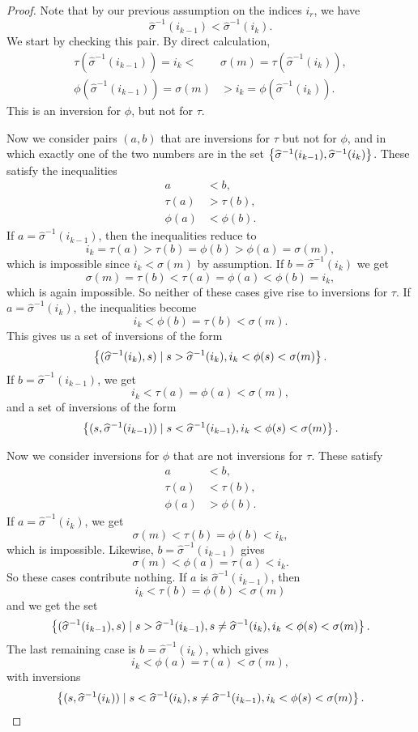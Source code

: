 \begin{proof}
  Note that by our previous assumption on the indices $i_r$, we have 
  \[ \widehat{\sigma}^{-1}(i_{k-1}) <
  \widehat{\sigma}^{-1}(i_{k}). \]
  We start by checking this pair. By direct calculation,
  \begin{align*}
    \tau(\widehat{\sigma}^{-1}(i_{k-1})) = i_k <\,& \sigma(m) =
    \tau(\widehat{\sigma}^{-1}(i_{k})), \\
    \phi(\widehat{\sigma}^{-1}(i_{k-1})) = \sigma(m) &> i_k =
    \phi(\widehat{\sigma}^{-1}(i_{k})).
  \end{align*}
  This is an inversion for $\phi$, but not for $\tau$. 

  Now we consider
  pairs $(a,b)$ that are inversions for $\tau$ but not for $\phi$, and
  in which exactly one of the two numbers are in the set
  $\left\{ \widehat{\sigma}^{-1}(i_{k-1}),\widehat{\sigma}^{-1}(i_{k}) \right\}$.
  These satisfy the inequalities
  \begin{align*}
    a &< b, \\
    \tau(a) &> \tau(b), \\
    \phi(a) &< \phi(b).
  \end{align*}
  If $a = \widehat{\sigma}^{-1}(i_{k-1})$, then the inequalities
  reduce to
  \[ i_k = \tau(a) > \tau(b) = \phi(b) > \phi(a) = \sigma(m), \]
  which is impossible since $i_k < \sigma(m)$ by assumption.
  If $b = \widehat{\sigma}^{-1}(i_{k})$ we get
  \[ \sigma(m) = \tau(b) < \tau(a) = \phi(a) < \phi(b) = i_k, \]
  which is again impossible. So neither of these cases give rise to
  inversions for $\tau$.
  If $a = \widehat{\sigma}^{-1}(i_{k})$, the inequalities become
  \[ i_k < \phi(b) = \tau(b) < \sigma(m). \]
  This gives us a set of inversions of the form
  \[ \left\{ (\widehat{\sigma}^{-1}(i_{k}),s) \mid s >
    \widehat{\sigma}^{-1}(i_{k}), i_k < \phi(s) < \sigma(m) \right\}. \]
  If $b = \widehat{\sigma}^{-1}(i_{k-1})$, we get
  \[ i_k < \tau(a) = \phi(a) < \sigma(m), \]
  and a set of inversions of the form
  \[ \left\{ (s,\widehat{\sigma}^{-1}(i_{k-1})) \mid s <
    \widehat{\sigma}^{-1}(i_{k-1}), i_k < \phi(s) < \sigma(m) \right\}. \]

  Now we consider inversions for $\phi$ that are not inversions for
  $\tau$. These satisfy
  \begin{align*}
    a &< b, \\
    \tau(a) &< \tau(b), \\
    \phi(a) &> \phi(b).
  \end{align*}
  If $a = \widehat{\sigma}^{-1}(i_{k})$, we get
  \[ \sigma(m) < \tau(b) = \phi(b) < i_k, \]
  which is impossible. Likewise, $b = \widehat{\sigma}^{-1}(i_{k-1})$
  gives
  \[ \sigma(m) < \phi(a) = \tau(a) < i_k. \]
  So these cases contribute nothing. If $a$ is
  $\widehat{\sigma}^{-1}(i_{k-1})$, then
  \[ i_k < \tau(b) = \phi(b) < \sigma(m) \]
  and we get the set
  \[ \left\{ (\widehat{\sigma}^{-1}(i_{k-1}),s) \mid s >
    \widehat{\sigma}^{-1}(i_{k-1}), s \neq
    \widehat{\sigma}^{-1}(i_{k}), i_k < \phi(s) < \sigma(m) \right\}. \]
  The last remaining case is $b = \widehat{\sigma}^{-1}(i_{k})$, which
  gives
  \[ i _k < \phi(a) = \tau(a) < \sigma(m), \]
  with inversions
  \[ \left\{  (s,\widehat{\sigma}^{-1}(i_{k})) \mid s <
    \widehat{\sigma}^{-1}(i_{k}), s \neq
    \widehat{\sigma}^{-1}(i_{k-1}), i_k < \phi(s) < \sigma(m)  \right\}. \]
  

\end{proof}
